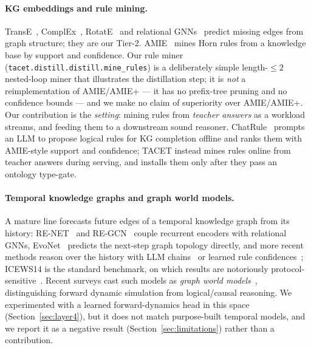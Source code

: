 \documentclass[11pt]{article}
\theoremstyle{plain}
\begin{document}
\paragraph{KG embeddings and rule mining.} TransE~\citep{bordes2013transe},
ComplEx~\citep{trouillon2016complex}, RotatE~\citep{sun2019rotate} and
relational GNNs~\citep{schlichtkrull2018rgcn} predict missing edges from
graph structure; they are our Tier-2. AMIE~\citep{galarraga2015amie} mines
Horn rules from a knowledge base by support and confidence. Our rule miner
(\texttt{tacet.distill.distill.mine\_rules}) is a deliberately simple
length-$\le 2$ nested-loop miner that illustrates the distillation step; it
is \emph{not} a reimplementation of AMIE/AMIE+ --- it has no prefix-tree
pruning and no confidence bounds --- and we make no claim of superiority
over AMIE/AMIE+. Our
contribution is the \emph{setting}: mining rules from \emph{teacher answers}
as a workload streams, and feeding them to a downstream sound reasoner.
ChatRule~\citep{chatrule2023} prompts an LLM to propose logical rules for
KG completion offline and ranks them with AMIE-style support and
confidence; TACET instead mines rules online from teacher answers during
serving, and installs them only after they pass an ontology type-gate.

\paragraph{Temporal knowledge graphs and graph world models.} A mature line
forecasts future edges of a temporal knowledge graph from its history:
RE-NET~\citep{jin2020renet} and RE-GCN~\citep{li2021regcn} couple recurrent
encoders with relational GNNs, EvoNet~\citep{wu2020evonet} predicts the
next-step graph topology directly, and more recent methods reason over the
history with LLM chains~\citep{chainhistory2024} or learned rule
confidences~\citep{counttrucola2025}; ICEWS14 is the standard benchmark, on
which results are notoriously protocol-sensitive~\citep{gastinger2022evaluation}.
Recent surveys cast such models as \emph{graph world
models}~\citep{liu2025gfm,liu2026gwmtaxonomy}, distinguishing forward
dynamic simulation from logical/causal reasoning. We experimented with a
learned forward-dynamics head in this space (Section~\ref{sec:layer4}), but
it does not match purpose-built temporal models, and we report it as a
negative result (Section~\ref{sec:limitations}) rather than a contribution.
\end{document}
